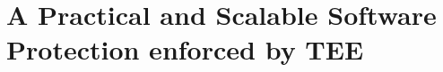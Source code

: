 \chapter{A Practical and Scalable Software Protection enforced by TEE}
\label{chp:static-protection} 

%
%

%
